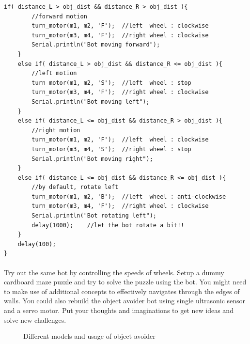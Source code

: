 \begin{lstlisting}[style=CStyle]
    if( distance_L > obj_dist && distance_R > obj_dist ){
        //forward motion
        turn_motor(m1, m2, 'F');  //left  wheel : clockwise
        turn_motor(m3, m4, 'F');  //right wheel : clockwise
        Serial.println("Bot moving forward");
    }
    else if( distance_L > obj_dist && distance_R <= obj_dist ){
        //left motion
        turn_motor(m1, m2, 'S');  //left  wheel : stop
        turn_motor(m3, m4, 'F');  //right wheel : clockwise
        Serial.println("Bot moving left");
    }
    else if( distance_L <= obj_dist && distance_R > obj_dist ){
        //right motion
        turn_motor(m1, m2, 'F');  //left  wheel : clockwise
        turn_motor(m3, m4, 'S');  //right wheel : stop
        Serial.println("Bot moving right");
    }
    else if( distance_L <= obj_dist && distance_R <= obj_dist ){
        //by default, rotate left
        turn_motor(m1, m2, 'B');  //left  wheel : anti-clockwise
        turn_motor(m3, m4, 'F');  //right wheel : clockwise
        Serial.println("Bot rotating left");
        delay(1000); 	//let the bot rotate a bit!!
    }
    delay(100);
}
\end{lstlisting}

\paragraph{ } Try out the same bot by controlling the speeds of wheels. Setup a dummy cardboard maze puzzle and try to solve the puzzle using the bot. You might need to make use of additional concepts to effectively navigates through the edges of walls. You could also rebuild the object avoider bot using single ultrasonic sensor and a servo motor. Put your thoughts and imaginations to get new ideas and solve new challenges.

\begin{figure}
    \centering
    \quad
    \caption[Object Avoider Bots]{Different models and usage of object avoider}
\end{figure}